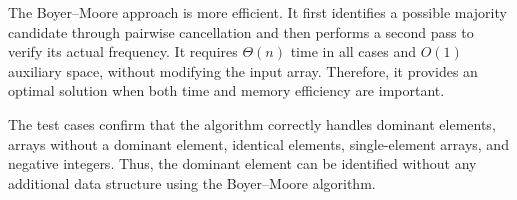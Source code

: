 \documentclass[12pt]{article}
\begin{document}
The Boyer--Moore approach is more efficient. It first identifies a possible majority candidate through pairwise cancellation and then performs a second pass to verify its actual frequency. It requires $\Theta(n)$ time in all cases and $O(1)$ auxiliary space, without modifying the input array. Therefore, it provides an optimal solution when both time and memory efficiency are important.

The test cases confirm that the algorithm correctly handles dominant elements, arrays without a dominant element, identical elements, single-element arrays, and negative integers. Thus, the dominant element can be identified without any additional data structure using the Boyer--Moore algorithm.
\end{document}

